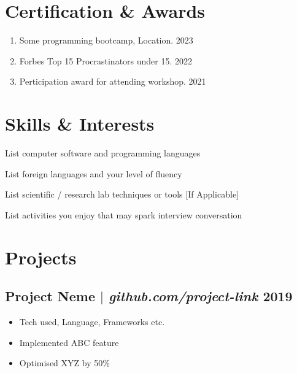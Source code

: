\documentclass[11pt]{article} %
\begin{document}
\section{Certification \& Awards}
\begin{enumerate}[label=\null, left=0pt..0pt, itemsep=0pt]
	\item Some programming bootcamp, Location. \hfill 2023
	\item Forbes Top 15 Procrastinators under 15. \hfill 2022
	\item Perticipation award for attending workshop. \hfill 2021
\end{enumerate}

\section{Skills \& Interests}
\begin{description}[itemsep=0pt]
	\item[Technical] List computer software and programming languages
	\item[Language] List foreign languages and your level of fluency
	\item[Laboratory] List scientific / research lab techniques or tools [If Applicable]
	\item[Interests] List activities you enjoy that may spark interview conversation
\end{description}

\section{Projects}
\subsection{Project Neme $|$ \normalfont\textit{github.com/project-link} \hfill 2019}
\begin{itemize}
  \item Tech used, Language, Frameworks etc.
  \item Implemented ABC feature
  \item Optimised XYZ by 50\%
\end{itemize}
\end{document}

